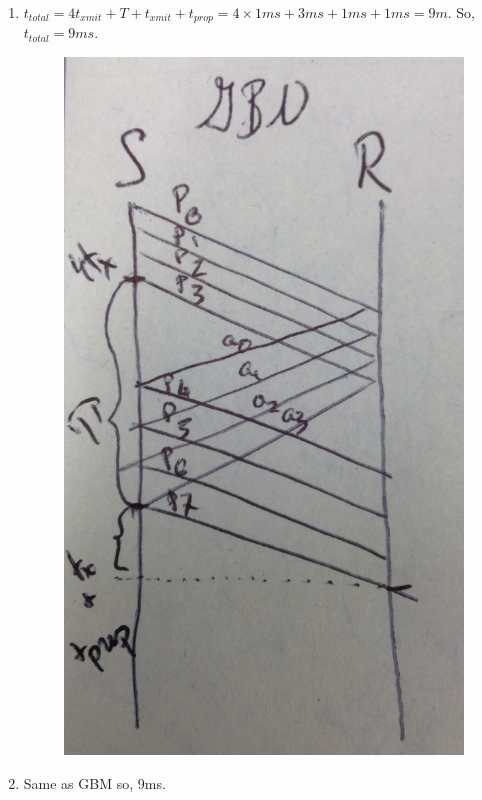 \documentclass[12pt]{article}
\begin{document}
\begin{enumerate}[label=\textbf{Part \arabic*)},leftmargin=*,align=left]
\begin{enumerate}[label=\textbf{\alph*)}]
\begin{figure}[H]
				\end{figure}
			\item $t_{total} = 4t_{xmit} + T + t_{xmit} + t_{prop} = 4 \times 1ms + 3ms + 1ms + 1ms = 9 m$. So, $t_{total} = 9ms$.
				\begin{figure}[H]
					\centering
					\includegraphics[scale=0.1]{GBN}	
				\end{figure}
			\item Same as GBM so, 9ms.
				\begin{figure}[H]
					\centering

\end{figure}
\end{enumerate}
\end{enumerate}
\end{document}
